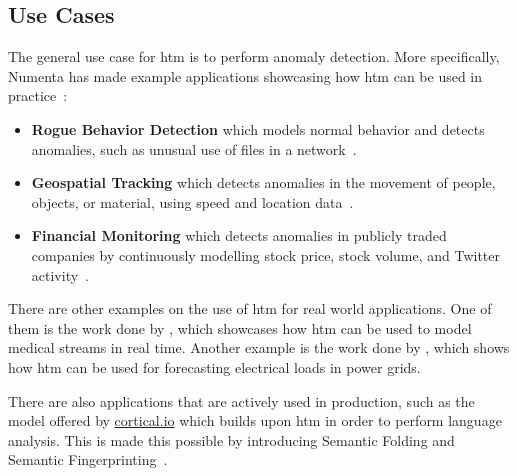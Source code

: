 \subsection{Use Cases}
The general use case for \gls*{htm} is to perform anomaly detection. More specifically, Numenta has made example applications showcasing how \gls*{htm} can be used in practice~\cite{numenta_example_apps}:
\begin{itemize}
    \item \textbf{Rogue Behavior Detection} which models normal behavior and detects anomalies, such as unusual use of files in a network~\cite{htm_rogue}.
    \item \textbf{Geospatial Tracking} which detects anomalies in the movement of people, objects, or material, using speed and location data~\cite{htm_geospatial}.
    \item \textbf{Financial Monitoring} which detects anomalies in publicly traded companies by continuously modelling stock price, stock volume, and Twitter activity~\cite{htm_finance}.
\end{itemize}
There are other examples on the use of \gls*{htm} for real world applications. One of them is the work done by \textcite{htm_medicine}, which showcases how \gls*{htm} can be used to model medical streams in real time. Another example is the work done by \textcite{htm_electrical_load}, which shows how \gls*{htm} can be used for forecasting electrical loads in power grids.
\par
There are also applications that are actively used in production, such as the model offered by \href{www.cortical.io}{cortical.io} which builds upon \gls*{htm} in order to perform language analysis. This is made this possible by introducing Semantic Folding and Semantic Fingerprinting~\cite{semantic_folding}.
